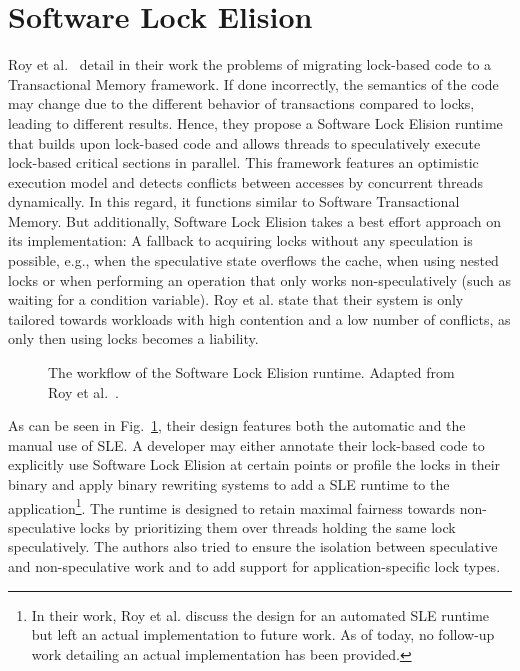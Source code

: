 \section{Software Lock Elision}
Roy et al.~\cite{roy2009runtime} detail in their work the problems of migrating lock-based code to a Transactional Memory framework.
If done incorrectly, the semantics of the code may change due to the different behavior of transactions compared to locks, leading to different results.
Hence, they propose a Software Lock Elision runtime that builds upon lock-based code and allows threads to speculatively execute lock-based critical sections in parallel.
This framework features an optimistic execution model and detects conflicts between accesses by concurrent threads dynamically.
In this regard, it functions similar to Software Transactional Memory.
But additionally, Software Lock Elision takes a best effort approach on its implementation:
A fallback to acquiring locks without any speculation is possible, e.g., when the speculative state overflows the cache, when using nested locks or when performing an operation that only works non-speculatively (such as waiting for a condition variable).
Roy et al. state that their system is only tailored towards workloads with high contention and a low number of conflicts, as only then using locks becomes a liability.

\begin{figure}
    \caption{The workflow of the Software Lock Elision runtime. Adapted from Roy et al.~\cite{roy2009runtime}.}%
    \label{fig:related:sle}
\end{figure}

As can be seen in Fig.~\ref{fig:related:sle}, their design features both the automatic and the manual use of SLE.
A developer may either annotate their lock-based code to explicitly use Software Lock Elision at certain points or profile the locks in their binary and apply binary rewriting systems to add a SLE runtime to the application\footnote{In their work, Roy et al. discuss the design for an automated SLE runtime but left an actual implementation to future work. As of today, no follow-up work detailing an actual implementation has been provided.}.
The runtime is designed to retain maximal fairness towards non-speculative locks by prioritizing them over threads holding the same lock speculatively.
The authors also tried to ensure the isolation between speculative and non-speculative work and to add support for application-specific lock types.

